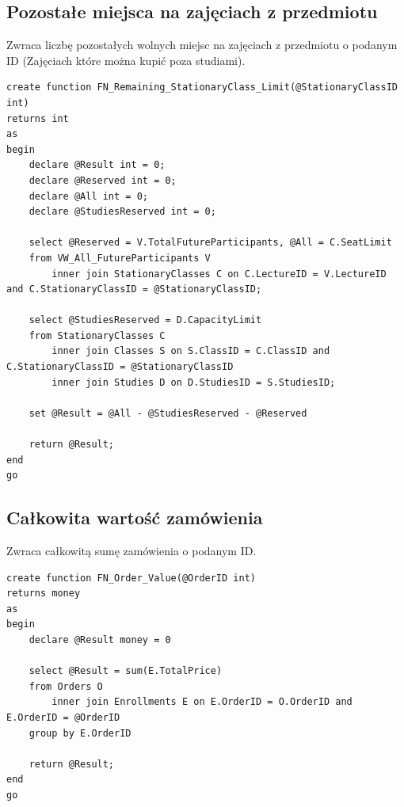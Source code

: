 \documentclass[11pt,a4paper]{article}
\begin{document}
\subsection{Pozostałe miejsca na zajęciach z przedmiotu}
Zwraca liczbę pozostałych wolnych miejsc na zajęciach z przedmiotu o podanym ID (Zajęciach które można kupić poza studiami).
\begin{Verbatim}[breaklines=true]
create function FN_Remaining_StationaryClass_Limit(@StationaryClassID int)
returns int
as
begin
    declare @Result int = 0;
    declare @Reserved int = 0;
    declare @All int = 0;
    declare @StudiesReserved int = 0;

    select @Reserved = V.TotalFutureParticipants, @All = C.SeatLimit
    from VW_All_FutureParticipants V 
        inner join StationaryClasses C on C.LectureID = V.LectureID and C.StationaryClassID = @StationaryClassID;

    select @StudiesReserved = D.CapacityLimit
    from StationaryClasses C 
        inner join Classes S on S.ClassID = C.ClassID and C.StationaryClassID = @StationaryClassID
        inner join Studies D on D.StudiesID = S.StudiesID;

    set @Result = @All - @StudiesReserved - @Reserved

    return @Result;
end
go
\end{Verbatim}

\subsection{Całkowita wartość zamówienia}
Zwraca całkowitą sumę zamówienia o podanym ID.
\begin{Verbatim}[breaklines=true]
create function FN_Order_Value(@OrderID int)
returns money
as
begin
    declare @Result money = 0

    select @Result = sum(E.TotalPrice)
    from Orders O 
        inner join Enrollments E on E.OrderID = O.OrderID and E.OrderID = @OrderID
    group by E.OrderID

    return @Result;
end
go
\end{Verbatim}
\end{document}
